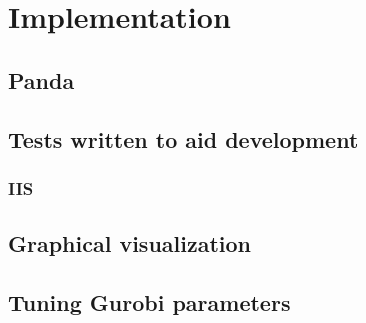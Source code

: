 \section{Implementation}
\subsection{Panda}
\subsection{Tests written to aid development}
\subsubsection{IIS}
\subsection{Graphical visualization}
\subsection{Tuning Gurobi parameters}
